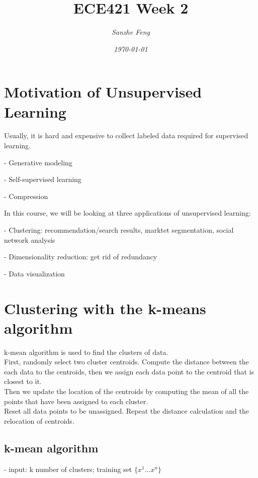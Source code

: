 \documentclass{article}
\begin{document}
\begin{titlepage}

\title{\textbf{ECE421 Week 2}}
\author{\textit{Sanzhe Feng}}
\date{\textit{\today}}
\maketitle
\end{titlepage}
\setlength{\parindent}{0pt}

\section*{Motivation of Unsupervised Learning}
Usually, it is hard and expensive to collect labeled data required for supervised learning.

- Generative modeling

- Self-supervised learning

- Compression

In this course, we will be looking at three applications of unsupervised learning:

- Clustering: recommendation/search results, marktet segmentation, social network analysis

- Dimensionality reduction: get rid of redundancy

- Data visualization

\section*{Clustering with the k-means algorithm}

k-mean algorithm is used to find the clusters of data.\\

First, randomly select two cluster centroids. Compute the distance between the each data to the centroids, then we assign each data point to the centroid that is closest to it.\\

Then we update the location of the centroids by computing the mean of all the points that have been assigned to each cluster. \\

Reset all data points to be unassigned. Repeat the distance calculation and the relocation of centroids. 


\subsection*{k-mean algorithm}
- input: k number of clusters; training set $\{x^{1}...x^{n}\}$
\end{document}
